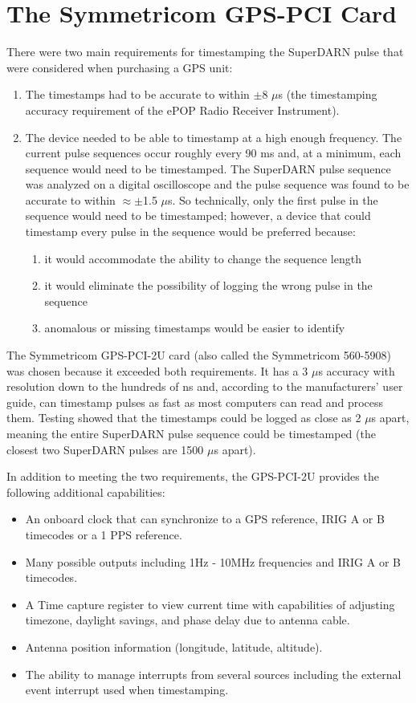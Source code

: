\documentclass[11pt]{article}
\begin{document}
\section{The Symmetricom GPS-PCI Card} \label{gpscard}
There were two main requirements for timestamping the SuperDARN pulse that were considered when purchasing a GPS unit:
\begin{enumerate}
 \item The timestamps had to be accurate to within $\pm$8 $\mu$s (the timestamping accuracy requirement of the ePOP Radio Receiver Instrument).
 \item The device needed to be able to timestamp at a high enough frequency.  The current pulse sequences occur roughly every 90 ms and, at a minimum, each sequence would need to be timestamped.  The SuperDARN pulse sequence was analyzed on a digital oscilloscope and the pulse sequence was found to be accurate to within $\approx \pm$1.5 $\mu$s.  So technically, only the first pulse in the sequence would need to be timestamped; however, a device that could timestamp every pulse in the sequence would be preferred because:
  \begin{enumerate}
   \item it would accommodate the ability to change the sequence length
   \item it would eliminate the possibility of logging the wrong pulse in the sequence
   \item anomalous or missing timestamps would be easier to identify
  \end{enumerate}
\end{enumerate}

The Symmetricom GPS-PCI-2U card (also called the Symmetricom 560-5908) was chosen because it exceeded both requirements.  It has a 3 $\mu$s accuracy with resolution down to the hundreds of ns and, according to the manufacturers' user guide, can timestamp pulses as fast as most computers can read and process them.  Testing showed that the timestamps could be logged as close as 2 $\mu$s apart, meaning the entire SuperDARN pulse sequence could be timestamped (the closest two SuperDARN pulses are 1500 $\mu$s apart).

In addition to meeting the two requirements, the GPS-PCI-2U provides the following additional capabilities:
\begin{itemize}
 \item An onboard clock that can synchronize to a GPS reference, IRIG A or B timecodes or a 1 PPS reference.
 \item Many possible outputs including 1Hz - 10MHz frequencies and IRIG A or B timecodes.
 \item A Time capture register to view current time with capabilities of adjusting timezone, daylight savings, and phase delay due to antenna cable.
 \item Antenna position information (longitude, latitude, altitude).
 \item The ability to manage interrupts from several sources including the external event interrupt used when timestamping.
\end{itemize}
\end{document}
